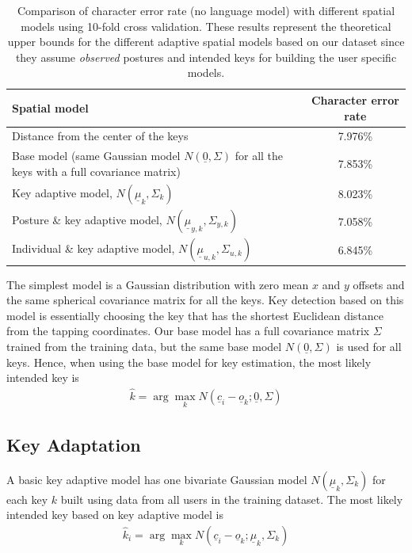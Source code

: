 \documentclass{sigchi}
\newcommand\tabhead[1]{\small\textbf{#1}}
\begin{document}
\begin{table} [tb]
  \centering
  \begin{tabular}{|l|c|}
    \hline
    \tabhead{Spatial model} &
    \multicolumn{1}{|p{0.2\columnwidth}|}{\centering\tabhead{Character
    error rate}} \\
    \hline
    Distance from the center of the keys & 7.976\% \\
    \hline
    \multicolumn{1}{|p{0.7\columnwidth}|}{Base model (same Gaussian model $N(\underline 0, \Sigma)$ for
    all the keys with a full covariance matrix)} & 7.853\% \\
    \hline
    \multicolumn{1}{|p{0.7\columnwidth}|}{Key adaptive model, $N(\underline \mu_k, \Sigma_k)$} & 8.023\% \\
    \hline
    \multicolumn{1}{|p{0.7\columnwidth}|}{Posture \& key adaptive model, $N(\underline \mu_{y,k}, \Sigma_{y,k})$} & 7.058\% \\
    \hline
     \multicolumn{1}{|p{0.7\columnwidth}|}{Individual \& key adaptive model, $N(\underline \mu_{u,k}, \Sigma_{u,k})$} & 6.845\% \\
    \hline
  \end{tabular}
  \caption{Comparison of character error rate (no language model) with
  different spatial models using 10-fold cross validation. These results represent the theoretical upper bounds for the different adaptive spatial models based on our dataset since they assume \textit{observed} postures and intended keys for building the user specific models.}
  \label{tab:comparison}
\end{table}

The simplest model is a Gaussian distribution with zero mean $x$ and $y$
 offsets and the same spherical covariance matrix for all the keys. Key
detection based on this model is essentially choosing the key that has the shortest Euclidean distance from the tapping coordinates. 
Our base model has a full covariance matrix $\Sigma$ trained from the
training data, but the same base model $N(\underline 0, \Sigma)$ is used for all keys. Hence, when using the base model for key estimation, the most likely intended key is
\begin{align}          
\hat k = \arg\max_k N(\underline c_i - \underline o_k; \underline 0, \Sigma)
\end{align}


\subsection{Key Adaptation}
A basic key adaptive model has one bivariate Gaussian model
$N(\underline\mu_k, \Sigma_k)$ for each key $k$ built  using data from all users in the training dataset. The most likely intended key based on key adaptive model is
\begin{align}          
\hat k_i = \arg\max_k N(\underline c_i - \underline o_k; \underline \mu_k, \Sigma_k)
\end{align}
\end{document}
